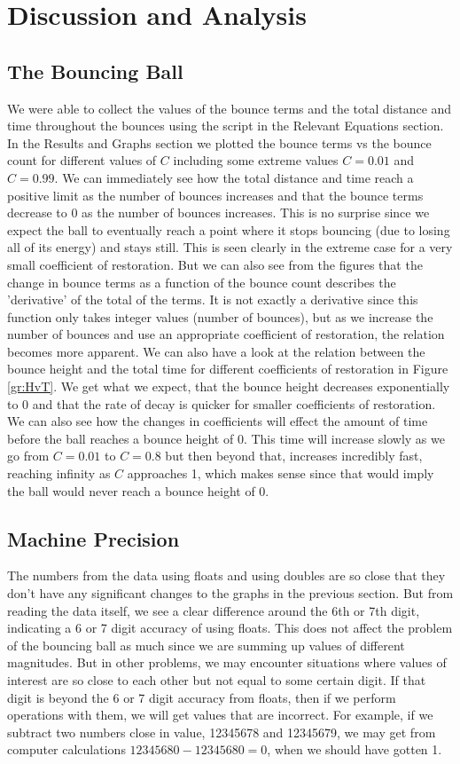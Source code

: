 \documentclass[aps,prl,twocolumn,superscriptaddress]{revtex4-1}
\begin{document}
\section{Discussion and Analysis}

\subsection{The Bouncing Ball}
We were able to collect the values of the bounce terms and the total distance and time throughout the bounces using the script in the Relevant Equations section. In the Results and Graphs section we plotted the bounce terms vs the bounce count for different values of $C$ including some extreme values $C = 0.01$ and $C = 0.99$. We can immediately see how the total distance and time reach a positive limit as the number of bounces increases and that the bounce terms decrease to 0 as the number of bounces increases. This is no surprise since we expect the ball to eventually reach a point where it stops bouncing (due to losing all of its energy) and stays still. This is seen clearly in the extreme case for a very small coefficient of restoration. But we can also see from the figures that the change in bounce terms as a function of the bounce count describes the 'derivative' of the total of the terms. It is not exactly a derivative since this function only takes integer values (number of bounces), but as we increase the number of bounces and use an appropriate coefficient of restoration, the relation becomes more apparent. We can also have a look at the relation between the bounce height and the total time for different coefficients of restoration in Figure \ref{gr:HvT}. We get what we expect, that the bounce height decreases exponentially to 0 and that the rate of decay is quicker for smaller coefficients of restoration. We can also see how the changes in coefficients will effect the amount of time before the ball reaches a bounce height of 0. This time will increase slowly as we go from $C = 0.01$ to $C = 0.8$ but then beyond that, increases incredibly fast, reaching infinity as $C$ approaches 1, which makes sense since that would imply the ball would never reach a bounce height of 0.

\subsection{Machine Precision}
The numbers from the data using floats and using doubles are so close that they don't have any significant changes to the graphs in the previous section. But from reading the data itself, we see a clear difference around the 6th or 7th digit, indicating a 6 or 7 digit accuracy of using floats. This does not affect the problem of the bouncing ball as much since we are summing up values of different magnitudes. But in other problems, we may encounter situations where values of interest are so close to each other but not equal to some certain digit. If that digit is beyond the 6 or 7 digit accuracy from floats, then if we perform operations with them, we will get values that are incorrect. For example, if we subtract two numbers close in value, 12345678 and 12345679, we may get from computer calculations $12345680 - 12345680 = 0$, when we should have gotten 1.
\end{document}

